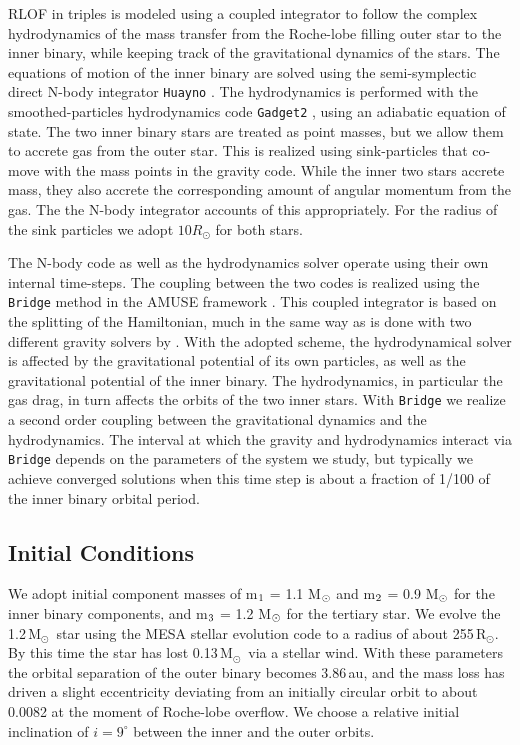 \documentclass{aastex62}
\newcommand{\MSun}{\mbox{M$_\odot$}}
\newcommand{\RSun}{\mbox{R$_\odot$}}
\begin{document}
RLOF in triples is modeled using a coupled integrator to follow the complex
hydrodynamics of the mass transfer from the Roche-lobe filling outer
star to the inner binary, while keeping track of the gravitational
dynamics of the stars.  The equations of motion of the inner binary are 
solved using the semi-symplectic direct N-body integrator
\texttt{Huayno} \citep{2012NewA...17..711P}. The hydrodynamics is
performed with the smoothed-particles hydrodynamics code
\texttt{Gadget2} \citep{2000ascl.soft03001S}, using an adiabatic
equation of state.  The two inner binary stars are treated as point
masses, but we allow them to accrete gas from the outer star.  This is
realized using sink-particles that co-move with the mass points in the
gravity code. While the inner two stars accrete mass, they also
accrete the corresponding amount of angular momentum from the gas.  
The the N-body integrator accounts of this appropriately.  For the
radius of the sink particles we adopt $10 R_\odot$ for both stars.

The N-body code as well as the hydrodynamics solver operate using
their own internal time-steps. The coupling between the two codes is
realized using the \texttt{Bridge} method in the AMUSE framework
\citep[see Sect.\.4.3.1 in][]{2013CoPhC.183..456P}.  This coupled
integrator is based on the splitting of the Hamiltonian, much in the
same way as is done with two different gravity solvers by
\cite{2007PASJ...59.1095F}. With the adopted scheme, the
hydrodynamical solver is affected by the gravitational potential of
its own particles, as well as the gravitational potential of the inner
binary. The hydrodynamics, in particular the gas drag, in turn affects
the orbits of the two inner stars. With \texttt{Bridge} we realize a
second order coupling between the gravitational dynamics and the
hydrodynamics.  The interval at which the gravity and hydrodynamics
interact via \texttt{Bridge} depends on the parameters of the system
we study, but typically we achieve converged solutions when this time
step is about a fraction of 1/100 of the inner binary orbital period.

\subsection{Initial Conditions} \label{Sect:ICs}

We adopt initial component masses of m$_{\rm 1}$ = 1.1 M$_{\rm \odot}$
and m$_{\rm 2}$ = 0.9 M$_{\rm \odot}$ for the inner binary components,
and m$_{\rm 3}$ = 1.2 M$_{\rm \odot}$ for the tertiary star.  We
evolve the 1.2\,\MSun\, star using the MESA stellar evolution code
\cite{2011ApJS..192....3P} to a radius of about 255\,\RSun.  By this
time the star has lost 0.13\,\MSun\, via a stellar wind.  With these
parameters the orbital separation of the outer binary becomes 3.86\,au,
and the mass loss has driven a slight eccentricity deviating from an initially
circular orbit to about 0.0082 at the moment of Roche-lobe
overflow. We choose a relative initial inclination of $i = 9^\circ$
between the inner and the outer orbits.
\end{document}
